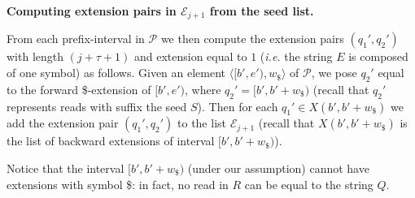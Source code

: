 \documentclass[runningheads,envcountsame,a4paper]{llncs}
\newcommand{\notaestesa}[2]{%
 \marginpar{\color{red!75!black}\textbf{\texttimes}}%
 {\color{red!75!black}%
 [\,\textbullet\,\textsf{\textbf{#1:}} %
 \textsf{\footnotesize#2}\,\textbullet\,]}%
}
\newcommand{\ie}{\textit{i.e.}\xspace}
\begin{document}
\begin{comment}
\notaestesa{RR}{Aggiungere tutti i riferimenti allo pseudocodice dopo averlo sistemato}

\noindent
{\bf  Computing the {\em seed-list}.}
Each element of the list $\mathcal{P}$ is made of a  \emph{prefix-interval} $[b',e')$
and its \$-width $w_\$ $ (recall that $w_\$ $ is  the number of     \$ backward \$-extension of  the $Q$-interval $[b,e)$ that is linked to $[b',e')$).
The list $\mathcal{P}$ is actually stored as a file and is sorted by ascending value of the starting
value $b'$ (\ie lexicographical order of $rev(Q)$). \notaestesa{RR}{Citare il classico problema di ordinamento in memoria esterna con la relativa citazione}.
Notice that the only operations allowed on that file are appending an item to
the end and popping (\ie reading from the head and deleting) an item.

\end{comment}

\noindent
{\bf Computing  extension pairs in $\mathcal{E}_{j+1}$ from the seed list.}


From each  prefix-interval in $\mathcal{P}$ we then compute the extension pairs $(q_{1}', q_{2}')$ with
length $(j+\tau+1)$ and extension equal to $1$ (\ie the string $E$ is composed of one symbol) as follows.
Given an element  $\langle [b',e'), w_\$ \rangle$ of $\mathcal{P}$,
we pose $q_{2}'$ equal to the forward \$-extension of  $[b',e')$, where   $q_{2}' = [b',b'+w_\$)$
(recall that $q_{2}'$ represents reads with suffix the seed $S$).
%
Then
for each $q_{1}'\in X(b',b'+w_\$)$ we add the extension pair  $(q_{1}',q_{2}')$ to
the list $\mathcal{E}_{j+1}$ (recall that $ X(b',b'+w_\$)$ is the list of backward extensions of interval $[b',b'+w_\$)$).


Notice that the interval $[b', b'+w_\$)$ (under our assumption) cannot have
extensions with symbol \$: in fact, no read in $R$ can be equal to the string $Q$.
\end{document}
